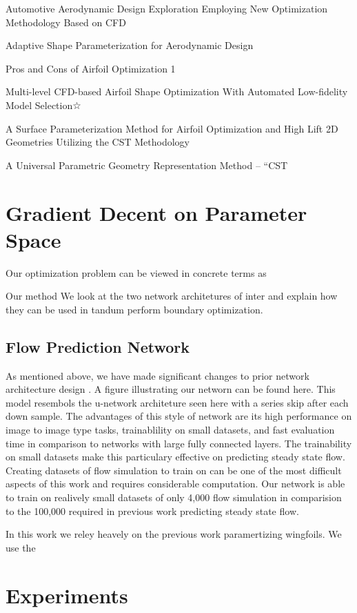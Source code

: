 \documentclass{article} %
\begin{document}
Automotive Aerodynamic Design Exploration
Employing New Optimization Methodology Based
on CFD

Adaptive Shape Parameterization for
Aerodynamic Design

Pros and Cons of Airfoil Optimization 1

Multi-level CFD-based Airfoil Shape Optimization With Automated Low-fidelity Model Selection☆

A Surface Parameterization Method for Airfoil Optimization
and High Lift 2D Geometries Utilizing the CST Methodology

A Universal Parametric Geometry Representation Method –
“CST


\section{Gradient Decent on Parameter Space}

Our optimization problem can be viewed in concrete terms as 

Our method We look at the two network architetures of inter and explain how they can be used in tandum perform boundary optimization.

\subsection{Flow Prediction Network}

As mentioned above, we have made significant changes to prior network architecture design . A figure illustrating our networn can be found here. This model resembols the u-network architeture seen here with a series skip after each down sample. The advantages of this style of network are its high performance on image to image type tasks, trainablility on small datasets, and fast evaluation time in comparison to networks with large fully connected layers. The trainability on small datasets make this particulary effective on predicting steady state flow. Creating datasets of flow simulation to train on can be one of the most difficult aspects of this work and requires considerable computation. Our network is able to train on realively small datasets of only 4,000 flow simulation in comparision to the 100,000 required in previous work predicting steady state flow. 

 In this work we reley heavely on the previous work paramertizing wingfoils. We use the 

\section{Experiments}
\end{document}
